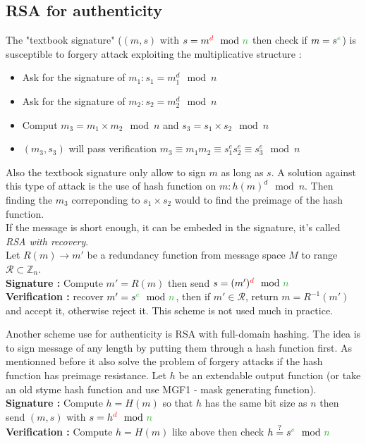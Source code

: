 \documentclass[11pt,a4paper]{report}
\begin{document}
\subsection{RSA for authenticity}
The "textbook signature" ($(m,s)$ with $s = m^{\textcolor{red}{d}} \mod \textcolor{ao}{n}$ then check if $m = s^{\textcolor{ao}{e}}$)  is susceptible to forgery attack exploiting the multiplicative structure :
\begin{itemize}
\item Ask for the signature of $m_1 : s_1 = m_1^d \mod n$
\item Ask for the signature of $m_2 : s_2 = m_2^d \mod n$
\item Comput $m_3 = m_1 \times m_2 \mod n$ and $s_3 = s_1 \times s_2 \mod n$
\item $(m_3,s_3)$ will pass verification $m_3 \equiv m_1 m_2 \equiv s_1^e s_2^e \equiv s_3^e \mod n$
\end{itemize}
Also the textbook signature only allow to sign $m$ as long as $s$. A solution against this type of attack is the use of hash function on $m : h(m)^d \mod n$. Then finding the $m_3$ correponding to $s_1 \times s_2$ would to find the preimage of the hash function.\\

If the message is short enough, it can be embeded in the signature, it's called \emph{RSA with recovery}.\\
Let $R(m) \rightarrow m'$ be a redundancy function from message space $M$ to range $\mathcal{R} \subset \mathbb{Z}_n$.\\ 
\textbf{Signature :} Compute $m' = R(m)$ then send $s = (m')^{\textcolor{red}{d}} \mod \textcolor{ao}{n}$\\
\textbf{Verification :} recover $m' = s^{\textcolor{ao}{e}} \mod \textcolor{ao}{n}$, then if $m' \in \mathcal{R}$, return $m = R^{-1}(m')$ and accept it, otherwise reject it. This scheme is not used much in practice.

Another scheme use for authenticity is RSA with full-domain hashing. The idea is to sign message of any length by putting them through a hash function first. As mentionned before it also solve the problem of forgery attacks if the hash function has preimage resistance. Let $h$ be an extendable output function (or take an old styme hash function and use MGF1 - mask generating function).\\
\textbf{Signature :} Compute $h = H(m)$ so that $h$ has the same bit size as \textcolor{ao}{$n$} then send $(m,s)$ with $s = h^{\textcolor{red}{d}} \mod \textcolor{ao}{n}$\\
\textbf{Verification : } Compute $h = H(m)$ like above then check $h \stackrel{?}{=} s^{\textcolor{ao}{e}} \mod \textcolor{ao}{n}$\\
\end{document}
